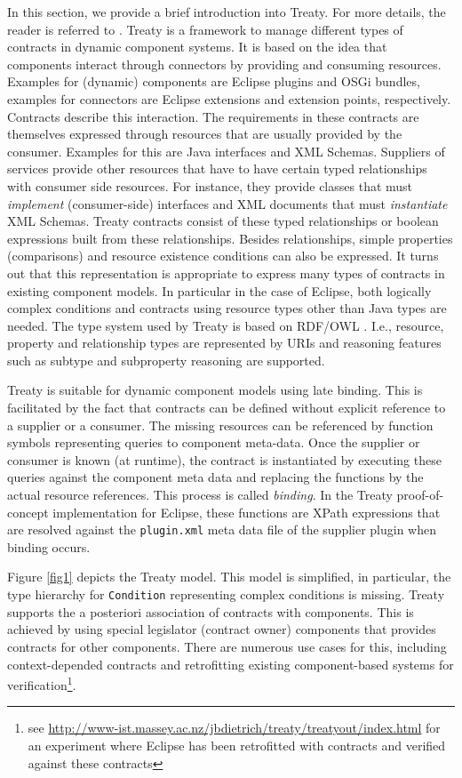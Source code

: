\documentclass{llncs}
\begin{document}
In this section, we provide a brief introduction into Treaty. For more details, the reader is referred to \cite{Treaty.JOT2009}. Treaty is a framework to manage different types of contracts in dynamic component systems. It is based on the idea 
that components interact through connectors by providing and consuming resources. Examples for (dynamic) components are Eclipse plugins and OSGi bundles, examples for connectors are Eclipse extensions and extension points, respectively. Contracts describe this interaction. The requirements in these contracts are themselves expressed through resources that are usually provided by the consumer. Examples for this
are Java interfaces and XML Schemas. Suppliers of services provide other resources that have to have certain typed relationships with consumer side resources. For instance, they provide classes that must \textit{implement} (consumer-side) 
interfaces and XML documents that must \textit{instantiate} XML Schemas. Treaty contracts consist of these typed relationships or boolean expressions built from these relationships. Besides relationships, simple properties (comparisons) and 
resource existence conditions can also be expressed. It turns out that this representation is appropriate to express many types of contracts in existing component models. In particular in the case of Eclipse,  both logically complex conditions and contracts using resource types other than Java types are needed. The type system used by Treaty is based on RDF/OWL \cite{RDF,OWL}. I.e., resource, property and relationship types are represented by URIs and reasoning features such as subtype and subproperty reasoning are supported. 

Treaty is suitable for dynamic component models using late binding. This is facilitated by the fact that contracts can be defined without explicit reference to a supplier or a consumer. The missing resources can be referenced by function symbols representing queries to component meta-data. Once the supplier or consumer is known (at runtime), the contract is instantiated by executing these queries against the component meta data and replacing the functions by the actual resource references. This process is called \textit{binding}. In the Treaty proof-of-concept implementation for Eclipse, these functions are XPath expressions that are resolved against the \texttt{plugin.xml} meta data file of the supplier plugin when binding occurs. 

Figure \ref{fig1} depicts the Treaty model. This model is simplified, in particular, the type hierarchy for \texttt{Condition} representing complex conditions is missing. Treaty supports the a posteriori association of contracts with components. 
This is achieved by using special legislator (contract owner) components that provides contracts for other components.  There are numerous use cases for this, including context-depended contracts and retrofitting existing component-based systems for verification\footnote{see \url{http://www-ist.massey.ac.nz/jbdietrich/treaty/treatyout/index.html} for an experiment where Eclipse has been retrofitted with contracts and verified against these contracts}.   
 
\end{document}
